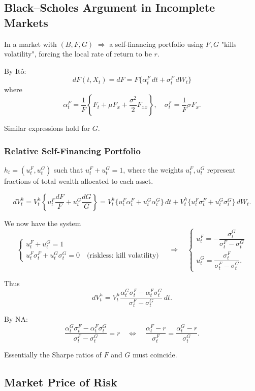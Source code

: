 \documentclass[12pt,a4paper]{article}
\theoremstyle{definition}
\begin{document}
\subsection{Black--Scholes Argument in Incomplete Markets}

In a market with $(B, F, G)$ $\Rightarrow$ a self-financing portfolio using $F, G$ "kills volatility", forcing the local rate of return to be $r$.

By Itô:
\[
dF(t, X_t) = dF = F\{\alpha_t^F \, dt + \sigma_t^F \, dW_t\}
\]
where
\[
\alpha_t^F = \frac{1}{F}\left\{F_t + \mu F_x + \frac{\sigma^2}{2} F_{xx}\right\}, \quad \sigma_t^F = \frac{1}{F} \sigma F_x.
\]

Similar expressions hold for $G$.

\subsubsection{Relative Self-Financing Portfolio}

$h_t = (u_t^F, u_t^G)$ such that $u_t^F + u_t^G = 1$, where the weights $u_t^F, u_t^G$ represent fractions of total wealth allocated to each asset.

\[
dV_t^h = V_t^h\left\{u_t^F \frac{dF}{F} + u_t^G \frac{dG}{G}\right\} = V_t^h\{u_t^F \alpha_t^F + u_t^G \alpha_t^G\} \, dt + V_t^h\{u_t^F \sigma_t^F + u_t^G \sigma_t^G\} \, dW_t.
\]

We now have the system
\[
\begin{cases}
u_t^F + u_t^G = 1 \\
u_t^F \sigma_t^F + u_t^G \sigma_t^G = 0 \quad \text{(riskless: kill volatility)}
\end{cases}
\quad \Rightarrow \quad
\begin{cases}
u_t^F = -\dfrac{\sigma_t^G}{\sigma_t^F - \sigma_t^G} \\[0.5em]
u_t^G = \dfrac{\sigma_t^F}{\sigma_t^F - \sigma_t^G}.
\end{cases}
\]

Thus
\[
dV_t^h = V_t^h \frac{\alpha_t^G \sigma_t^F - \alpha_t^F \sigma_t^G}{\sigma_t^F - \sigma_t^G} \, dt.
\]

By NA:
\[
\frac{\alpha_t^G \sigma_t^F - \alpha_t^F \sigma_t^G}{\sigma_t^F - \sigma_t^G} = r \quad \Longleftrightarrow \quad \frac{\alpha_t^F - r}{\sigma_t^F} = \frac{\alpha_t^G - r}{\sigma_t^G}.
\]

Essentially the Sharpe ratios of $F$ and $G$ must coincide.

\subsection{Market Price of Risk}
\end{document}

